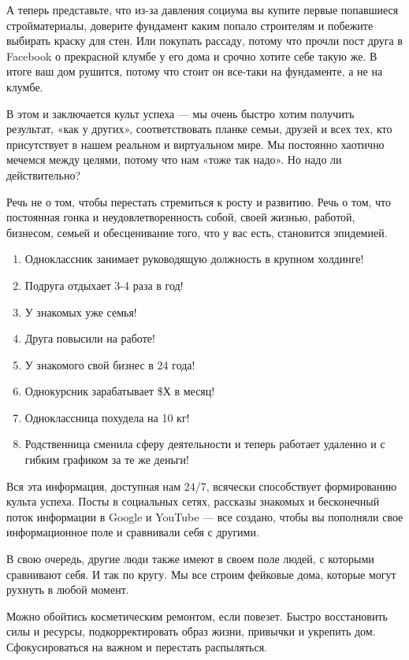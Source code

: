 А теперь представьте, что из-за давления социума вы купите первые попавшиеся стройматериалы, доверите фундамент каким попало строителям и побежите выбирать краску для стен. Или покупать рассаду, потому что прочли пост друга в Facebook о прекрасной клумбе у его дома и срочно хотите себе такую же. В итоге ваш дом рушится, потому что стоит он все-таки на фундаменте, а не на клумбе.

В этом и заключается культ успеха — мы очень быстро хотим получить результат, «как у других», соответствовать планке семьи, друзей и всех тех, кто присутствует в нашем реальном и виртуальном мире. Мы постоянно хаотично мечемся между целями, потому что нам «тоже так надо». Но надо ли действительно?

Речь не о том, чтобы перестать стремиться к росту и развитию. Речь о том, что постоянная гонка и неудовлетворенность собой, своей жизнью, работой, бизнесом, семьей и обесценивание того, что у вас есть, становится эпидемией.

\begin{enumerate}
    \item Одноклассник занимает руководящую должность в крупном холдинге!
    \item Подруга отдыхает 3-4 раза в год!
    \item У знакомых уже семья!
    \item Друга повысили на работе!
    \item У знакомого свой бизнес в 24 года!
    \item Однокурсник зарабатывает \$Х в месяц!
    \item Одноклассница похудела на 10 кг!
    \item Родственница сменила сферу деятельности и теперь работает удаленно и с гибким графиком за те же деньги!
\end{enumerate}

Вся эта информация, доступная нам 24/7, всячески способствует формированию культа успеха. Посты в социальных сетях, рассказы знакомых и бесконечный поток информации в Google и YouTube — все создано, чтобы вы пополняли свое информационное поле и сравнивали себя с другими.

\begin{fancyquotes}
    В свою очередь, другие люди также имеют в своем поле людей, с которыми сравнивают себя. И так по кругу. Мы все строим фейковые дома, которые могут рухнуть в любой момент.
\end{fancyquotes}

Можно обойтись косметическим ремонтом, если повезет. Быстро восстановить силы и ресурсы, подкорректировать образ жизни, привычки и укрепить дом. Сфокусироваться на важном и перестать распыляться.

